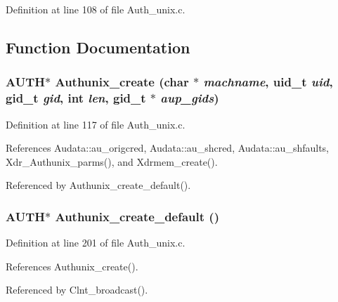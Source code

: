 Definition at line 108 of file Auth\_\-unix.c.

\subsection{Function Documentation}
\subsubsection{\setlength{\rightskip}{0pt plus 5cm}AUTH$\ast$ Authunix\_\-create (char $\ast$ {\em machname}, uid\_\-t {\em uid}, gid\_\-t {\em gid}, int {\em len}, gid\_\-t $\ast$ {\em aup\_\-gids})}\label{Auth__unix_8c_a10}




Definition at line 117 of file Auth\_\-unix.c.

References Audata::au\_\-origcred, Audata::au\_\-shcred, Audata::au\_\-shfaults, Xdr\_\-Authunix\_\-parms(), and Xdrmem\_\-create().

Referenced by Authunix\_\-create\_\-default().
\subsubsection{\setlength{\rightskip}{0pt plus 5cm}AUTH$\ast$ Authunix\_\-create\_\-default ()}\label{Auth__unix_8c_a11}




Definition at line 201 of file Auth\_\-unix.c.

References Authunix\_\-create().

Referenced by Clnt\_\-broadcast().